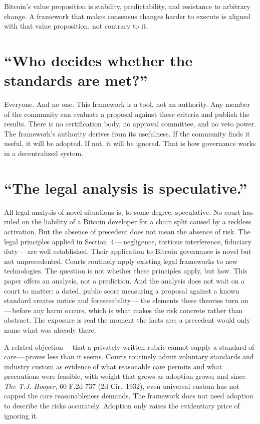 \documentclass[11pt, twoside, openright]{book}
\begin{document}
Bitcoin's value proposition is stability, predictability, and resistance to arbitrary change. A framework that makes consensus changes harder to execute is aligned with that value proposition, not contrary to it.

\section{\texorpdfstring{``Who decides whether the standards are met?''}{\textquotedblleft Who decides whether the standards are met?\textquotedblright}}

Everyone. And no one. This framework is a tool, not an authority. Any member of the community can evaluate a proposal against these criteria and publish the results. There is no certification body, no approval committee, and no veto power. The framework's authority derives from its usefulness. If the community finds it useful, it will be adopted. If not, it will be ignored. That is how governance works in a decentralized system.

\section{\texorpdfstring{``The legal analysis is speculative.''}{\textquotedblleft The legal analysis is speculative.\textquotedblright}}

All legal analysis of novel situations is, to some degree, speculative. No court has ruled on the liability of a Bitcoin developer for a chain split caused by a reckless activation. But the absence of precedent does not mean the absence of risk. The legal principles applied in Section~4\,---\,negligence, tortious interference, fiduciary duty\,---\,are well established. Their application to Bitcoin governance is novel but not unprecedented. Courts routinely apply existing legal frameworks to new technologies. The question is not whether these principles apply, but how. This paper offers an analysis, not a prediction. And the analysis does not wait on a court to matter: a dated, public score measuring a proposal against a known standard creates notice and foreseeability\,---\,the elements these theories turn on\,---\,before any harm occurs, which is what makes the risk concrete rather than abstract. The exposure is real the moment the facts are; a precedent would only name what was already there.

A related objection\,---\,that a privately written rubric cannot supply a standard of care\,---\,proves less than it seems. Courts routinely admit voluntary standards and industry custom as evidence of what reasonable care permits and what precautions were feasible, with weight that grows as adoption grows; and since \textit{The T.J. Hooper}, 60 F.2d 737 (2d Cir.~1932), even universal custom has not capped the care reasonableness demands. The framework does not need adoption to describe the risks accurately. Adoption only raises the evidentiary price of ignoring it.
\end{document}
